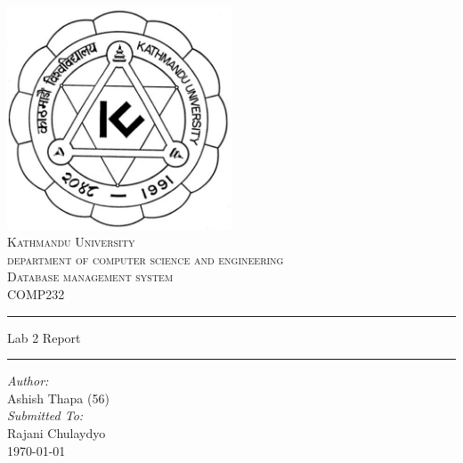 \documentclass{article}
\begin{document}
\begin{titlepage}
	\begin{center}
		\includegraphics[width=0.5\textwidth]{assets/ku.png}\\[1cm]
		\textsc{\LARGE Kathmandu University}\\[0.2cm]
		\textsc{\large department of computer science and engineering}\\[2cm]

\textsc{\Large Database management system}\\[0.2cm]
\textsc{\large COMP232}\\[1cm]

\hrule \vspace{0.5cm}
{\Large Lab 2 Report} \\[0.5cm]
\hrule \vspace{0.5cm}


\large
\emph{Author:}\\
Ashish Thapa (56)\\[1cm]


\emph{Submitted To:}\\
Rajani Chulaydyo \\[1.5cm]

{\large \today}\\[1cm]

\end{center}
\end{titlepage}

\tableofcontents
\end{document}
